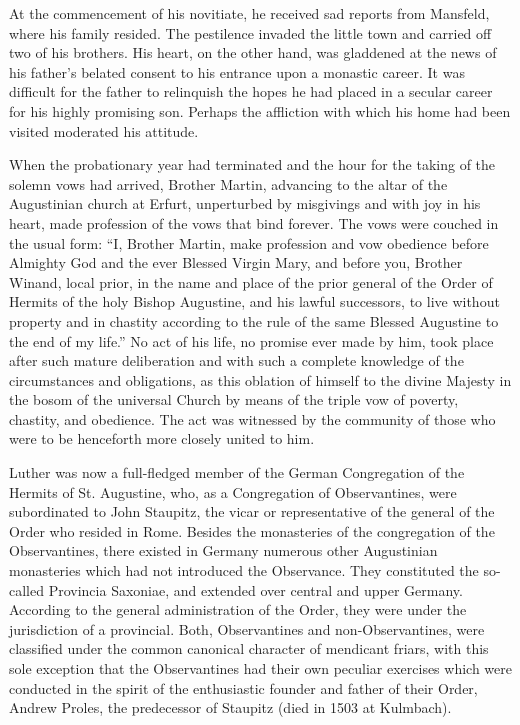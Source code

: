 At the commencement of his novitiate, he received sad reports
from Mansfeld, where his family resided. The pestilence invaded the
little town and carried off two of his brothers. His heart, on the
other hand, was gladdened at the news of his father’s belated consent
to his entrance upon a monastic career. It was difficult for the father to relinquish the hopes he had placed in a secular career for his
highly promising son. Perhaps the affliction with which his home had
been visited moderated his attitude.

When the probationary year had terminated and the hour for the
taking of the solemn vows had arrived, Brother Martin, advancing
to the altar of the Augustinian church at Erfurt, unperturbed by
misgivings and with joy in his heart, made profession of the vows
that bind forever. The vows were couched in the usual form:
``I, Brother Martin, make profession and vow obedience before Almighty God and the ever Blessed Virgin Mary, and before you,
Brother Winand, local prior, in the name and place of the prior general of the Order of Hermits of the holy Bishop Augustine, and his
lawful successors, to live without property and in chastity according
to the rule of the same Blessed Augustine to the end of my life.''
No act of his life, no promise ever made by him, took place after such
mature deliberation and with such a complete knowledge of the circumstances and obligations,
as this oblation of himself to the divine
Majesty in the bosom of the universal Church by means of the triple
vow of poverty, chastity, and obedience. The act was witnessed by
the community of those who were to be henceforth more closely
united to him.

Luther was now a full-fledged member of the German Congregation of the Hermits of St. Augustine,
who, as a Congregation of Observantines, were subordinated to John Staupitz, the vicar or
representative of the general of the Order who resided in Rome.
Besides the monasteries of the congregation of the Observantines, there
existed in Germany numerous other Augustinian monasteries which
had not introduced the Observance. They constituted the so-called
Provincia Saxoniae, and extended over central and upper Germany.
According to the general administration of the Order, they were
under the jurisdiction of a provincial. Both, Observantines and non-Observantines,
were classified under the common canonical character of mendicant friars,
with this sole exception that the Observantines had their own peculiar exercises which were conducted in the
spirit of the enthusiastic founder and father of their Order, Andrew
Proles, the predecessor of Staupitz (died in 1503 at Kulmbach).

